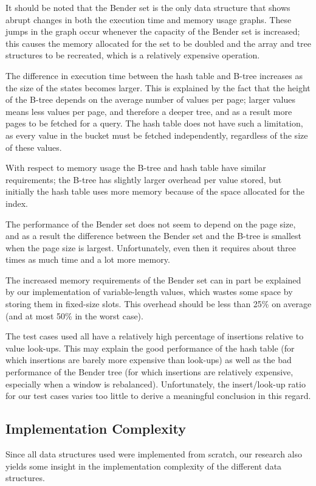 \documentclass{acm_proc_article-sp}
\begin{document}
It should be noted that the Bender set is the only data structure that shows
abrupt changes in both the execution time and memory usage graphs. These
jumps in the graph occur whenever the capacity of the Bender set is increased;
this causes the memory allocated for the set to be doubled and the array and
tree structures to be recreated, which is a relatively expensive operation.

The difference in execution time between the hash table and B-tree increases as
the size of the states becomes larger. This is explained by the fact that the
height of the B-tree depends on the average number of values per page; larger
values means less values per page, and therefore a deeper tree, and as a
result more pages to be fetched for a query. The hash table does not have such a
limitation, as every value in the bucket must be fetched independently, regardless
of the size of these values.

With respect to memory usage the B-tree and hash table have similar requirements;
the B-tree has slightly larger overhead per value stored, but initially the hash
table uses more memory because of the space allocated for the index.

The performance of the Bender set does not seem to depend on the page size,
and as a result the difference between the Bender set and the B-tree is smallest
when the page size is largest. Unfortunately, even then it requires about three
times as much time and a lot more memory.

The increased memory requirements of the Bender set can in part be explained by
our implementation of variable-length values, which wastes some space by storing
them in fixed-size slots. This overhead should be less than 25\% on average
(and at most 50\% in the worst case).

The test cases used all have a relatively high percentage of insertions relative
to value look-ups. This may explain the good performance of the hash table (for
which insertions are barely more expensive than look-ups) as well as the bad
performance of the Bender tree (for which insertions are relatively expensive,
especially when a window is rebalanced). Unfortunately, the insert/look-up
ratio for our test cases varies too little to derive a meaningful conclusion
in this regard.

\subsection{Implementation Complexity}
Since all data structures used were implemented from scratch, our research
also yields some insight in the implementation complexity of the different
data structures.
\end{document}

